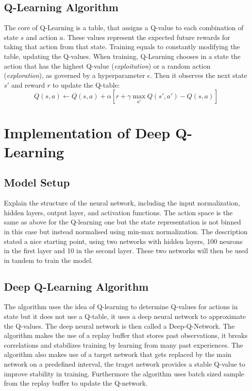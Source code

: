\documentclass[a4paper,12pt]{article}
\begin{document}
\subsection{Q-Learning Algorithm}
The core of Q-Learning is a table, that assigns a Q-value to each combination of state \(s\) and action \(a\). These values represent the expected future
rewards for taking that action from that state. Training equals to constantly modifying the table, updating the Q-values. When training, Q-Learning chooses in a state
the action that has the highest Q-value (\textit{exploitation}) or a random action (\textit{exploration}), as governed by a hyperparameter \(\epsilon\).
Then it observes the next state \(s'\) and reward \(r\) to update the Q-table:
$$
Q(s, a) \leftarrow Q(s, a) + \alpha \left[ r + \gamma \max_{a'} Q(s', a') - Q(s, a) \right]
$$

\section{Implementation of Deep Q-Learning}
\subsection{Model Setup}
Explain the structure of the neural network, including the input normalization, hidden layers, output layer, and activation functions.
The action space is the same as above for the Q-learning one but the state representation is not binned in this case but instead normalised using min-max normalization.
The description stated a nice starting point, using two networks with hidden layers, 100 neurons in the first layer and 10 in the second layer. 
These two networks will then be used in tandem to train the model.

\subsection{Deep Q-Learning Algorithm}
The algorithm uses the idea of Q-learning to determine Q-values for actions in state but it does not use a Q-table, it uses a deep neural network to approximate the Q-values.
The deep neural network is then called a Deep-Q-Network. 
The algorithm makes the use of a replay buffer that stores past observations, it breaks correlations and stabilizes training by learning from many past experiences. 
The algorithm also makes use of a target network that gets replaced by the main network on a predefined interval, the traget network provides a stable Q-value to improve stability in training.
Furthermore the algorithm uses batch sized sample from the replay buffer to update the Q-network.
\end{document}
